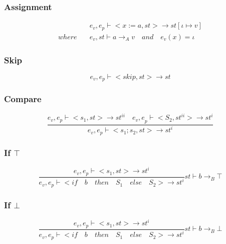\subsubsection{Assignment}
\begin{align*}
	&{ e }_{ v },{ e }_{ p }\vdash <x:=a,st>\rightarrow st[\iota \mapsto v]\\
	where\quad &{ e }_{ v },st\vdash a{ \rightarrow  }_{ A }v\quad and\quad  { e }_{ v }(x)=\iota 
\end{align*}


\subsubsection{Skip}
\begin{equation}
	{ e }_{ v },{ e }_{ p }\vdash <skip,st>\rightarrow st
\end{equation}


\subsubsection{Compare}
\begin{equation}
	\frac { { e }_{ v },{ e }_{ p }\vdash <{ s }_{ 1 },st>\rightarrow { st }^{ ii }\quad { e }_{ v }{ ,e }_{ p }\vdash <{ S }_{ 2 },{ st }^{ ii }>\rightarrow { st }^{ i } }{ { e }_{ v },{ e }_{ p }\vdash <{ s }_{ 1 };{ s }_{ 2 },st>\rightarrow { st }^{ i } } 
\end{equation}


\subsubsection{If $\top$}
\begin{equation}
	\frac { { e }_{ v },{ e }_{ p }\vdash <{ s }_{ 1 },st>\rightarrow { st }^{ i } }{ { e }_{ v },{ e }_{ p }\vdash <if\quad b\quad then\quad { S }_{ 1 }\quad else{ \quad S }_{ 2 }>\rightarrow { st }^{ i } } st\vdash b{ \rightarrow  }_{ B }\top 
\end{equation}

\subsubsection{If $\bot$}
\begin{equation}
	\frac { { e }_{ v },{ e }_{ p }\vdash <{ s }_{ 1 },st>\rightarrow { st }^{ i } }{ { e }_{ v },{ e }_{ p }\vdash <if\quad b\quad then\quad { S }_{ 1 }\quad else{ \quad S }_{ 2 }>\rightarrow { st }^{ i } } st\vdash b{ \rightarrow  }_{ B }\bot 
\end{equation}


